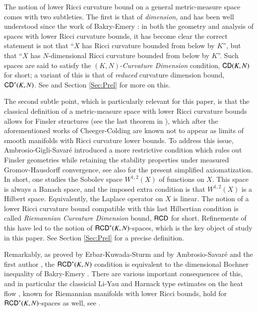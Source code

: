 \documentclass[11pt,reqno]{amsart}
\newcommand{\CD}{{\sf CD}}
\newcommand{\RCD}{{\sf RCD}}
\theoremstyle{definition}
\theoremstyle{remark}
\theoremstyle{remark}
\theoremstyle{remark}
\theoremstyle{remark}
\theoremstyle{remark}
\theoremstyle{remark}
\theoremstyle{remark}
\begin{document}
The notion of  lower Ricci curvature bound on a general metric-measure space comes with two subtleties. The first is that of \emph{dimension}, and has been well understood since the work of Bakry-Emery \cite{BakryEmery_diffusions}:  in both the geometry and analysis of spaces with lower Ricci curvature bounds, it has become clear the correct statement is not that ``$X$ has Ricci curvature bounded from below by $K$'', but that ``$X$ has $N$-dimensional Ricci curvature bounded from below by $K$''. Such spaces are said to satisfy the $(K,N)$-\emph{Curvature Dimension} condition, $\CD(K,N)$ for short; a variant of this is that of \emph{reduced} curvature dimension bound, $\CD^*(K,N)$.  See \cite{BS2010, BakryEmery_diffusions, Sturm06II} and Section \ref{Sec:Prel} for more on this.

The second subtle point, which is particularly relevant for this paper, is that the classical definition of a metric-measure space with lower Ricci curvature bounds allows for Finsler structures (see the last theorem in \cite{Villani09}), which after the aforementioned works of Cheeger-Colding are known not to appear as limits of smooth manifolds with Ricci curvature lower bounds.  To address this issue, Ambrosio-Gigli-Savar\'e \cite{AGS11b} introduced a more restrictive condition which rules out Finsler geometries while retaining the stability properties under measured Gromov-Hausdorff convergence, see also \cite{AGMR2012} for the present simplified axiomatization.  In short, one studies the Sobolev space $W^{1,2}(X)$ of functions on $X$.  This space is always a Banach space, and the imposed extra condition  is that $W^{1,2}(X)$ is a Hilbert space.  Equivalently, the Laplace operator on $X$ is linear.  The notion of a lower Ricci curvature bound compatible with this last Hilbertian condition is called  \emph{Riemannian Curvature Dimension} bound, $\RCD$ for short.  Refinements of this have led to the notion of $\RCD^*(K,N)$-spaces, which is the key object of study in this paper.  See Section \ref{Sec:Prel} for a precise definition.

Remarkably, as proved by Erbar-Kuwada-Sturm \cite{EKS2013} and by Ambrosio-Savar\'e and the first author \cite{AMS2013}, the $\RCD^*(K,N)$ condition is equivalent to the dimensional Bochner inequality of Bakry-Emery \cite{BakryEmery_diffusions}.  There are various important consequences of this, and in particular the classicial Li-Yau and Harnack type estimates on the heat flow \cite{LY86}, known for Riemannian manifolds with lower Ricci bounds,  hold for $\RCD^*(K,N)$-spaces as well, see \cite{GaMo}.
\end{document}
